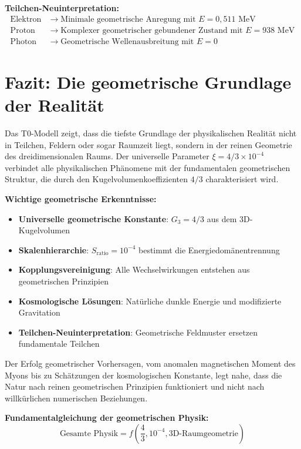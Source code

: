 \documentclass[12pt,a4paper]{report}
\begin{document}
	\textbf{Teilchen-Neuinterpretation:}
	\begin{align}
		\text{Elektron} &\rightarrow \text{Minimale geometrische Anregung mit } E = 0,511 \text{ MeV} \\
		\text{Proton} &\rightarrow \text{Komplexer geometrischer gebundener Zustand mit } E = 938 \text{ MeV} \\
		\text{Photon} &\rightarrow \text{Geometrische Wellenausbreitung mit } E = 0
	\end{align}
	
	\section{Fazit: Die geometrische Grundlage der Realität}
	\label{sec:conclusion_geometric}
	
	Das T0-Modell zeigt, dass die tiefste Grundlage der physikalischen Realität nicht in Teilchen, Feldern oder sogar Raumzeit liegt, sondern in der reinen Geometrie des dreidimensionalen Raums. Der universelle Parameter $\xi = 4/3 \times 10^{-4}$ verbindet alle physikalischen Phänomene mit der fundamentalen geometrischen Struktur, die durch den Kugelvolumenkoeffizienten $4/3$ charakterisiert wird.
	
	\textbf{Wichtige geometrische Erkenntnisse:}
	
	\begin{itemize}
		\item \textbf{Universelle geometrische Konstante}: $G_3 = 4/3$ aus dem 3D-Kugelvolumen
		\item \textbf{Skalenhierarchie}: $S_{\text{ratio}} = 10^{-4}$ bestimmt die Energiedomänentrennung
		\item \textbf{Kopplungsvereinigung}: Alle Wechselwirkungen entstehen aus geometrischen Prinzipien
		\item \textbf{Kosmologische Lösungen}: Natürliche dunkle Energie und modifizierte Gravitation
		\item \textbf{Teilchen-Neuinterpretation}: Geometrische Feldmuster ersetzen fundamentale Teilchen
	\end{itemize}
	
	Der Erfolg geometrischer Vorhersagen, vom anomalen magnetischen Moment des Myons bis zu Schätzungen der kosmologischen Konstante, legt nahe, dass die Natur nach reinen geometrischen Prinzipien funktioniert und nicht nach willkürlichen numerischen Beziehungen.
	
	\textbf{Fundamentalgleichung der geometrischen Physik:}
	\begin{equation}
		\boxed{\text{Gesamte Physik} = f\left(\frac{4}{3}, 10^{-4}, \text{3D-Raumgeometrie}\right)}
	\end{equation}
	
\end{document}
